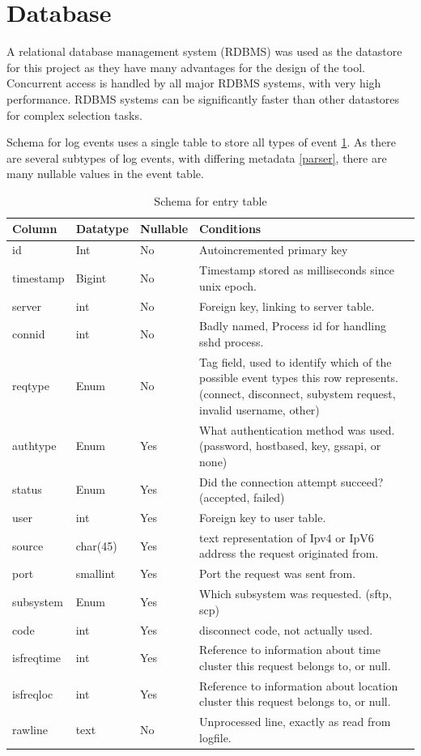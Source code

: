 \section{Database} 

A relational database management system (RDBMS) was used as the datastore for this project as they have many advantages for the design of the tool. Concurrent access is handled by all major RDBMS systems, with very high performance. RDBMS systems can be significantly faster than other datastores for complex selection tasks. 

Schema for log events uses a single table to store all types of event \ref{entry_schema}. As there are several subtypes of log events, with differing metadata \ref{parser}, there are many nullable values in the event table.
\begin{table}[tbh]
\centering
\begin{tabular}{l || l | l | p{}}
Column & Datatype & Nullable & Conditions \\ \hline
id & Int & No & Autoincremented primary key \\
timestamp & Bigint & No & Timestamp stored as milliseconds since unix epoch. \\
server & int & No & Foreign key, linking to server table. \\
connid & int & No & Badly named, Process id for handling sshd process. \\
reqtype & Enum & No & Tag field, used to identify which of the possible event types this row represents. (connect, disconnect, subystem request, invalid username, other) \\
authtype & Enum & Yes & What authentication method was used. (password, hostbased, key, gssapi, or none) \\
status & Enum & Yes & Did the connection attempt succeed? (accepted, failed) \\
user & int & Yes & Foreign key to user table. \\
source & char(45) & Yes & text representation of Ipv4 or IpV6 address the request originated from. \\
port & smallint & Yes & Port the request was sent from. \\
subsystem & Enum & Yes & Which subsystem was requested. (sftp, scp) \\
code & int & Yes & disconnect code, not actually used. \\
isfreqtime & int & Yes & Reference to information about time cluster this request belongs to, or null. \\
isfreqloc & int & Yes & Reference to information about location cluster this request belongs to, or null. \\
rawline & text & No & Unprocessed line, exactly as read from logfile. \\
\end {tabular}
\caption{Schema for entry table}
\label{entry_schema}
\end{table}

